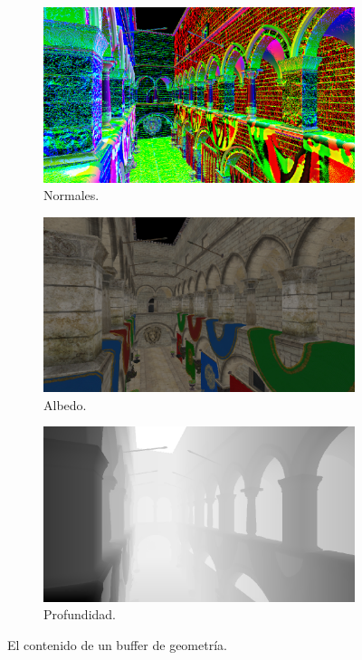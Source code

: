 \begin{figure}[H]
	\centering
	\begin{subfigure}[t]{0.32\textwidth}
		\centering
		\captionsetup{justification=centering}
		\includegraphics[width=\linewidth]{media/engine-Context2-Texture13level0.png}
		\caption*{Normales.}
	\end{subfigure}%
	\hspace{0.01\textwidth}
	\begin{subfigure}[t]{0.32\textwidth}
		\centering
		\captionsetup{justification=centering}
		\includegraphics[width=\linewidth]{media/engine-Context2-Texture14level0.png}
		\caption*{Albedo.}
	\end{subfigure}%
	\hspace{0.01\textwidth}
	\begin{subfigure}[t]{0.32\textwidth}
		\centering
		\captionsetup{justification=centering}
		\includegraphics[width=\linewidth]{media/engine-Context2-Texture17level0.png}
		\caption*{Profundidad.}
	\end{subfigure}%
	\caption{El contenido de un buffer de geometría.}
	\label{fig:gbuffer}
\end{figure}